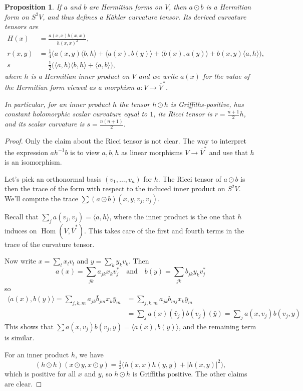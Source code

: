 \documentclass[11pt]{article}
\newtheorem{prop}[theo]{Proposition}
\newtheorem*{proof}{Proof}
\def\qandq{\quad\text{and}\quad}
\DeclareMathOperator{\Hom}{Hom}
\begin{document}
\begin{prop}
  If $a$ and $b$ are Hermitian forms on $V$, then $a \odot b$ is a Hermitian form on $S^2V$, and thus defines a K\"ahler curvature tensor. Its derived curvature tensors are
\begin{align*}
H(x) &= \frac{a(x,x)b(x,x)}{h(x,x)^2},
\\
r(x,y) &= \tfrac 14 \bigl(
a(x,y) \langle b, h \rangle
+ \langle a(x), b(y) \rangle
+ \langle b(x), a(y) \rangle
+ b(x,y) \langle a, h \rangle
\bigr),
\\
s &= \tfrac 12 \bigl(
\langle a, h \rangle \langle b, h \rangle
+ \langle a, b \rangle
\bigr),
\end{align*}
where $h$ is a Hermitian inner product on $V$ and we write $a(x)$ for the value of the Hermitian form viewed as a morphism $a : V \to \overline V^*$.

In particular, for an inner product $h$ the tensor $h \odot h$ is Griffiths-positive, has constant holomorphic scalar curvature equal to $1$, its Ricci tensor is $r = \frac{n+1}{2} h$, and its scalar curvature is $s = \frac{n(n+1)}2$.
\end{prop}

\begin{proof}
  Only the claim about the Ricci tensor is not clear. The way to interpret the expression $ah^{-1}b$ is to view $a, b, h$ as linear morphisms $V \to \overline V^*$ and use that $h$ is an isomorphism.

Let's pick an orthonormal basis $(v_1, \ldots, v_n)$ for $h$. The Ricci tensor of $a \odot b$ is then the trace of the form with respect to the induced inner product on $S^2V$. We'll compute the trace $\sum (a\odot b) (x,y,v_j,v_j)$.

Recall that $\sum_j a(v_j,v_j) = \langle a, h \rangle$, where the inner product is the one that $h$ induces on $\Hom(V, \overline V^*)$. This takes care of the first and fourth terms in the trace of the curvature tensor.

Now write $x = \sum_{l} x_l v_l$ and $y = \sum_{k} y_k v_k$. Then
\[
a(x) = \sum_{jk} a_{jk}x_k v_j^*
\qandq
b(y) = \sum_{jk} b_{jk} y_k v_j^*
\]
so
\begin{align*}
\langle a(x), b(y) \rangle
= \sum_{j,k,m} a_{jk} \bar b_{jm} x_k \bar y_m
&= \sum_{j,k,m} a_{jk} b_{mj} x_k \bar y_m
\\
&= \sum_{j}a(x)(\bar v_j) b(v_j)(\bar y)
= \sum_j a(x,v_j) b(v_j, y)
\end{align*}
This shows that $\sum a(x,v_j)b(v_j,y) = \langle a(x), b(y) \rangle$, and the remaining term is similar.

For an inner product $h$, we have
$$
(h \odot h)(x \odot y, x \odot y)
= \tfrac12 \bigl(
h(x,x)h(y,y) + |h(x,y)|^2
\bigr),
$$
which is positive for all $x$ and $y$, so $h \odot h$ is Griffiths positive. The other claims are clear.
\end{proof}
\end{document}

